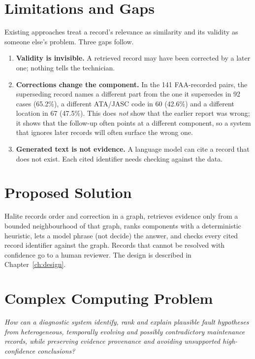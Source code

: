 \section{Limitations and Gaps}
Existing approaches treat a record's relevance as similarity and its validity as someone else's problem. Three gaps follow.
\begin{enumerate}
\item \textbf{Validity is invisible.} A retrieved record may have been corrected by a later one; nothing tells the technician.
\item \textbf{Corrections change the component.} In the 141 FAA-recorded pairs, the superseding record names a different part from the one it supersedes in 92 cases (65.2\%), a different ATA/JASC code in 60 (42.6\%) and a different location in 67 (47.5\%). This does \emph{not} show that the earlier report was wrong; it shows that the follow-up often points at a different component, so a system that ignores later records will often surface the wrong one.
\item \textbf{Generated text is not evidence.} A language model can cite a record that does not exist. Each cited identifier needs checking against the data.
\end{enumerate}

\section{Proposed Solution}
Halite records order and correction in a graph, retrieves evidence only from a bounded neighbourhood of that graph, ranks components with a deterministic heuristic, lets a model phrase (not decide) the answer, and checks every cited record identifier against the graph. Records that cannot be resolved with confidence go to a human reviewer. The design is described in Chapter~\ref{ch:design}.

\section{Complex Computing Problem}
\emph{How can a diagnostic system identify, rank and explain plausible fault hypotheses from heterogeneous, temporally evolving and possibly contradictory maintenance records, while preserving evidence provenance and avoiding unsupported high-confidence conclusions?}

